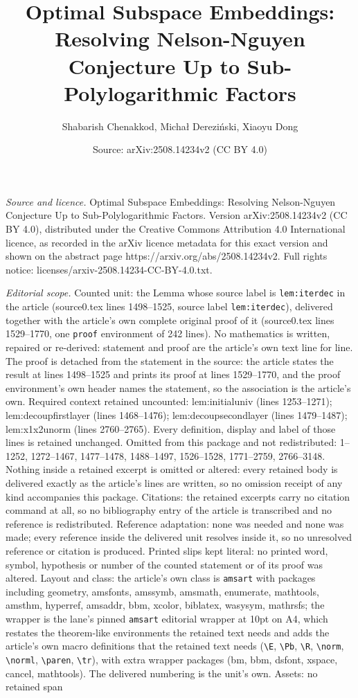 \documentclass[10pt,a4paper]{amsart}
\title[Optimal Subspace Embeddings: Resolving Nelson-Nguyen Conject]{Optimal Subspace Embeddings: Resolving Nelson-Nguyen Conjecture Up to Sub-Polylogarithmic Factors}
\author{Shabarish Chenakkod, Micha{\l} Derezi\'nski, Xiaoyu Dong}
\date{Source: arXiv:2508.14234v2 (CC BY 4.0)}
\begin{document}
\maketitle

\noindent\emph{Source and licence.} Optimal Subspace Embeddings: Resolving Nelson-Nguyen Conjecture Up to Sub-Polylogarithmic Factors. Version arXiv:2508.14234v2 (CC BY 4.0), distributed under the Creative Commons Attribution 4.0 International licence, as recorded in the arXiv licence metadata for this exact version and shown on the abstract page https://arxiv.org/abs/2508.14234v2. Full rights notice: licenses/arxiv-2508.14234-CC-BY-4.0.txt.\par\smallskip

\noindent\textit{Editorial scope.} Counted unit: the Lemma whose source label is \texttt{lem:iterdec} in the article (source0.tex lines 1498--1525, source label \texttt{lem:iterdec}), delivered together with the article's own complete original proof of it (source0.tex lines 1529--1770, one \texttt{proof} environment of 242 lines). No mathematics is written, repaired or re-derived: statement and proof are the article's own text line for line. The proof is detached from the statement in the source: the article states the result at lines 1498--1525 and prints its proof at lines 1529--1770, and the proof environment's own header names the statement, so the association is the article's own. Required context retained uncounted: lem:initialuniv (lines 1253--1271); lem:decoupfirstlayer (lines 1468--1476); lem:decoupsecondlayer (lines 1479--1487); lem:x1x2unorm (lines 2760--2765). Every definition, display and label of those lines is retained unchanged. Omitted from this package and not redistributed: 1--1252, 1272--1467, 1477--1478, 1488--1497, 1526--1528, 1771--2759, 2766--3148. Nothing inside a retained excerpt is omitted or altered: every retained body is delivered exactly as the article's lines are written, so no omission receipt of any kind accompanies this package. Citations: the retained excerpts carry no citation command at all, so no bibliography entry of the article is transcribed and no reference is redistributed. Reference adaptation: none was needed and none was made; every reference inside the delivered unit resolves inside it, so no unresolved reference or citation is produced. Printed slips kept literal: no printed word, symbol, hypothesis or number of the counted statement or of its proof was altered. Layout and class: the article's own class is \texttt{amsart} with packages including geometry, amsfonts, amssymb, amsmath, enumerate, mathtools, amsthm, hyperref, amsaddr, bbm, xcolor, biblatex, wasysym, mathrsfs; the wrapper is the lane's pinned \texttt{amsart} editorial wrapper at 10pt on A4, which restates the theorem-like environments the retained text needs and adds the article's own macro definitions that the retained text needs (\texttt{\textbackslash E}, \texttt{\textbackslash Pb}, \texttt{\textbackslash R}, \texttt{\textbackslash norm}, \texttt{\textbackslash norml}, \texttt{\textbackslash paren}, \texttt{\textbackslash tr}), with extra wrapper packages (bm, bbm, dsfont, xspace, cancel, mathtools). The delivered numbering is the unit's own. Assets: no retained span 
\end{document}
